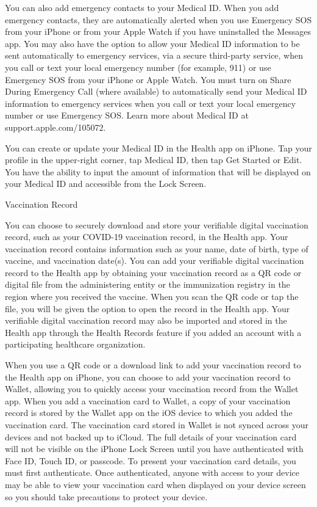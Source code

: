 You can also add emergency contacts to your Medical ID. When you add emergency contacts, they are automatically alerted when you use Emergency SOS from your iPhone or from your Apple Watch if you have uninstalled the Messages app. You may also have the option to allow your Medical ID information to be sent automatically to emergency services, via a secure third-party service, when you call or text your local emergency number (for example, 911) or use Emergency SOS from your iPhone or Apple Watch. You must turn on Share During Emergency Call (where available) to automatically send your Medical ID information to emergency services when you call or text your local emergency number or use Emergency SOS. Learn more about Medical ID at support.apple.com/105072.

You can create or update your Medical ID in the Health app on iPhone. Tap your profile in the upper-right corner, tap Medical ID, then tap Get Started or Edit. You have the ability to input the amount of information that will be displayed on your Medical ID and accessible from the Lock Screen.

Vaccination Record

You can choose to securely download and store your verifiable digital vaccination record, such as your COVID-19 vaccination record, in the Health app. Your vaccination record contains information such as your name, date of birth, type of vaccine, and vaccination date(s). You can add your verifiable digital vaccination record to the Health app by obtaining your vaccination record as a QR code or digital file from the administering entity or the immunization registry in the region where you received the vaccine. When you scan the QR code or tap the file, you will be given the option to open the record in the Health app. Your verifiable digital vaccination record may also be imported and stored in the Health app through the Health Records feature if you added an account with a participating healthcare organization.

When you use a QR code or a download link to add your vaccination record to the Health app on iPhone, you can choose to add your vaccination record to Wallet, allowing you to quickly access your vaccination record from the Wallet app. When you add a vaccination card to Wallet, a copy of your vaccination record is stored by the Wallet app on the iOS device to which you added the vaccination card. The vaccination card stored in Wallet is not synced across your devices and not backed up to iCloud. The full details of your vaccination card will not be visible on the iPhone Lock Screen until you have authenticated with Face ID, Touch ID, or passcode. To present your vaccination card details, you must first authenticate. Once authenticated, anyone with access to your device may be able to view your vaccination card when displayed on your device screen so you should take precautions to protect your device.

